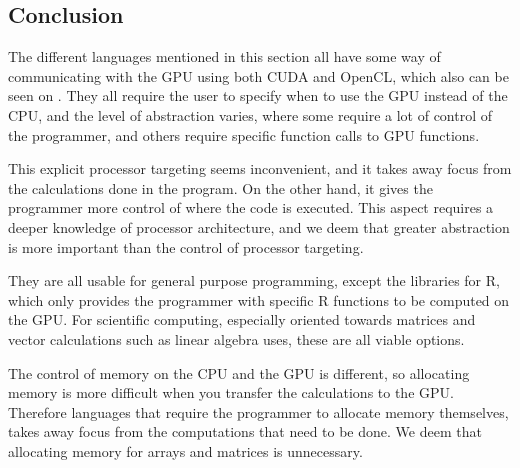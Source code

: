  

\subsection{Conclusion}  

The different languages mentioned in this section all have some way of communicating with the GPU using both CUDA and OpenCL, which also can be seen on  .
They all require the user to specify when to use the GPU instead of the CPU, and the level of abstraction varies, where some require a lot of control of the programmer, and others require specific function calls to GPU functions.

This explicit processor targeting seems inconvenient, and it takes away focus from the calculations done in the program.
On the other hand, it gives the programmer more control of where the code is executed.
This aspect requires a deeper knowledge of processor architecture, and we deem that greater abstraction is more important than the control of processor targeting.

They are all usable for general purpose programming, except the libraries for R, which only provides the programmer with specific R functions to be computed on the GPU.
For scientific computing, especially oriented towards matrices and vector calculations such as linear algebra uses, these are all viable options.

The control of memory on the CPU and the GPU is different, so allocating memory is more difficult when you transfer the calculations to the GPU.
Therefore languages that require the programmer to allocate memory themselves, takes away focus from the computations that need to be done.
We deem that allocating memory for arrays and matrices is unnecessary.
                     